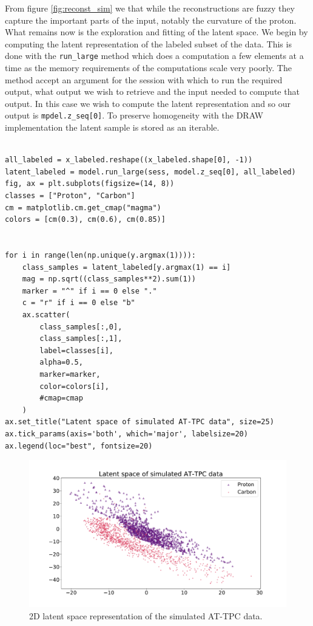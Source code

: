 From figure \ref{fig:reconst_sim} we that while the reconstructions are fuzzy they capture the important parts of the input, notably  the curvature of the proton. What remains now is the exploration and fitting of the latent space. We begin by computing the latent representation of the labeled subset of the data. This is done with the \lstinline{run_large} method which does a computation a few elements at a time as the memory requirements of the computations scale very poorly. The method accept an argument for the session with which to run the required output, what output we wish to retrieve and the input needed to compute that output. In this case we wish to compute the latent representation and so our output is \lstinline{mpdel.z_seq[0]}. To preserve homogeneity with the DRAW implementation the latent sample is stored as an iterable. 

\begin{minipage}{\linewidth}
\begin{lstlisting}[language=iPython]

all_labeled = x_labeled.reshape((x_labeled.shape[0], -1))
latent_labeled = model.run_large(sess, model.z_seq[0], all_labeled)
fig, ax = plt.subplots(figsize=(14, 8))
classes = ["Proton", "Carbon"]
cm = matplotlib.cm.get_cmap("magma")
colors = [cm(0.3), cm(0.6), cm(0.85)]


for i in range(len(np.unique(y.argmax(1)))):
    class_samples = latent_labeled[y.argmax(1) == i]
    mag = np.sqrt((class_samples**2).sum(1))
    marker = "^" if i == 0 else "."
    c = "r" if i == 0 else "b"
    ax.scatter(
        class_samples[:,0],
        class_samples[:,1],
        label=classes[i],
        alpha=0.5,
        marker=marker,
        color=colors[i],
        #cmap=cmap
    )
ax.set_title("Latent space of simulated AT-TPC data", size=25)
ax.tick_params(axis='both', which='major', labelsize=20)
ax.legend(loc="best", fontsize=20) 
\end{lstlisting}
\end{minipage}

\begin{figure}[H]
\centering
\includegraphics[width=\textwidth]{latent_sim.pdf}
\caption[2D latent space for simulated data]{2D latent space representation of the simulated AT-TPC data.}\label{fig:latent_sim}
\end{figure}

